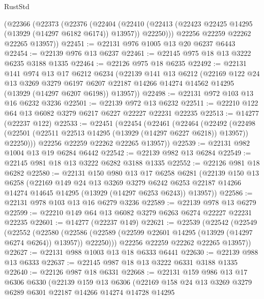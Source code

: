 \begin{lexlean}{RustStd}
\begin{coremodule}
    (@22366
      (@22373
        (@22376
          (@22404
            (@22410 (@22413 (@22423 @22425 @14295 (@13929 (@14297 @6182 @6174)) @13957)) @22250)))
        @22256
        @22259
        @22262
        @22265
        @13957))
@22451 := @22131 @976 @1005 @13 @20 @6237 @6443
@22454 := @22139 @976 @13 @6237
@22461 := @22145 @975 @18 @13 @3222 @6235 @3188 @1335
@22464 := @22126 @975 @18 @6235
@22492 := @22131
    @141
    @974
    @13
    @17
    @6212
    @6234
    (@22139
      @141
      @13
      @6212
      (@22169
        @122
        @24
        @13
        @3269
        @3279
        @6197
        @6207
        @22187
        @14266
        @14274
        @14562
        @14295
        (@13929 (@14297 @6207 @6198))
        @13957))
@22498 := @22131 @972 @103 @13 @16 @6232 @3236
@22501 := @22139 @972 @13 @6232
@22511 := @22210 @122 @64 @13 @6082 @3279 @6217 @6227 @22227 @22231 @22235
@22513 := @14277 (@22237 @122)
@22533 := @22451
    (@22454
      (@22461
        (@22464
          (@22492
            (@22498 (@22501 (@22511 @22513 @14295 (@13929 (@14297 @6227 @6218)) @13957)) @22250)))
        @22256
        @22259
        @22262
        @22265
        @13957))
@22539 := @22131 @982 @1004 @13 @19 @6284 @6442
@22542 := @22139 @982 @13 @6284
@22549 := @22145 @981 @18 @13 @3222 @6282 @3188 @1335
@22552 := @22126 @981 @18 @6282
@22580 := @22131
    @150
    @980
    @13
    @17
    @6258
    @6281
    (@22139
      @150
      @13
      @6258
      (@22169
        @149
        @24
        @13
        @3269
        @3279
        @6242
        @6253
        @22187
        @14266
        @14274
        @14645
        @14295
        (@13929 (@14297 @6253 @6243))
        @13957))
@22586 := @22131 @978 @103 @13 @16 @6279 @3236
@22589 := @22139 @978 @13 @6279
@22599 := @22210 @149 @64 @13 @6082 @3279 @6263 @6274 @22227 @22231 @22235
@22601 := @14277 (@22237 @149)
@22621 := @22539
    (@22542
      (@22549
        (@22552
          (@22580
            (@22586 (@22589 (@22599 @22601 @14295 (@13929 (@14297 @6274 @6264)) @13957)) @22250)))
        @22256
        @22259
        @22262
        @22265
        @13957))
@22627 := @22131 @988 @1003 @13 @18 @6333 @6441
@22630 := @22139 @988 @13 @6333
@22637 := @22145 @987 @18 @13 @3222 @6331 @3188 @1335
@22640 := @22126 @987 @18 @6331
@22668 := @22131
    @159
    @986
    @13
    @17
    @6306
    @6330
    (@22139
      @159
      @13
      @6306
      (@22169
        @158
        @24
        @13
        @3269
        @3279
        @6289
        @6301
        @22187
        @14266
        @14274
        @14728
        @14295

\end{coremodule}
\end{lexlean}
